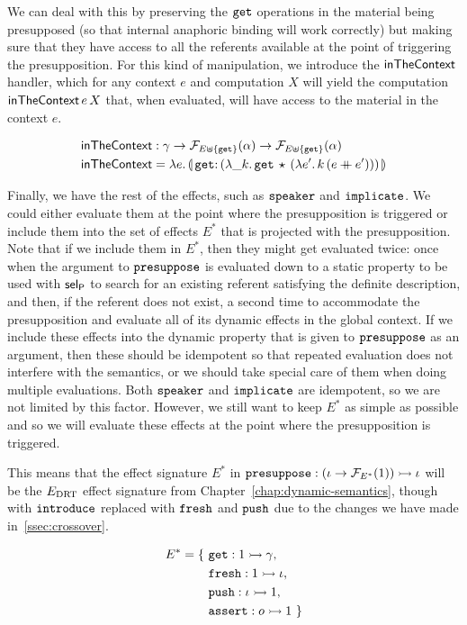 We can deal with this by preserving the $\mathtt{get}$ operations in the
material being presupposed (so that internal anaphoric binding will work
correctly) but making sure that they have access to all the referents
available at the point of triggering the presupposition. For this kind of
manipulation, we introduce the $\textsf{inTheContext}$ handler, which for any
context $e$ and computation $X$ will yield the computation
$\textsf{inTheContext}\,e\,X$ that, when evaluated, will have access to the
material in the context $e$.

\begin{align*}
  \inTheContext &: \gamma \to \FF_{E \uplus \{\op{get}\}}(\alpha)
                          \to \FF_{E \uplus \{\op{get}\}}(\alpha) \\
  \inTheContext &= \lam{e}{\banana{\onto{\op{get}}{(\lam{\_ k}{\app{\op{get}}{\star}{(\lam{e'}{\ap{k}{(e \cat e')}})}})}}}
\end{align*}

Finally, we have the rest of the effects, such as $\mathtt{speaker}$ and
$\mathtt{implicate}$. We could either evaluate them at the point where the
presupposition is triggered or include them into the set of effects $E^*$
that is projected with the presupposition. Note that if we include them in
$E^*$, then they might get evaluated twice: once when the argument to
$\mathtt{presuppose}$ is evaluated down to a static property to be used with
$\textsf{sel}_{\textsf{P}}$ to search for an existing referent satisfying the definite
description, and then, if the referent does not exist, a second time to
accommodate the presupposition and evaluate all of its dynamic effects in
the global context. If we include these effects into the dynamic property
that is given to $\mathtt{presuppose}$ as an argument, then these should be
idempotent so that repeated evaluation does not interfere with the
semantics, or we should take special care of them when doing multiple
evaluations. Both $\mathtt{speaker}$ and $\mathtt{implicate}$ are idempotent, so we
are not limited by this factor. However, we still want to keep $E^*$ as
simple as possible and so we will evaluate these effects at the point where
the presupposition is triggered.

This means that the effect signature $E^*$ in
$\mathtt{presuppose} : (\iota \to \mathcal{F}_{E^*}(1)) \rightarrowtail \iota$ will be the
$E_{\mathrm{DRT}}$ effect signature from Chapter~\ref{chap:dynamic-semantics}, though
with $\mathtt{introduce}$ replaced with $\mathtt{fresh}$ and $\mathtt{push}$ due to the
changes we have made in~\ref{ssec:crossover}.

\begin{align*}
  E^* = \{\ &\mathtt{get} : 1 \rightarrowtail \gamma, \\
            &\mathtt{fresh} : 1 \rightarrowtail \iota, \\
            &\mathtt{push} : \iota \rightarrowtail 1, \\
            &\mathtt{assert} : o \rightarrowtail 1\ \}
\end{align*}

